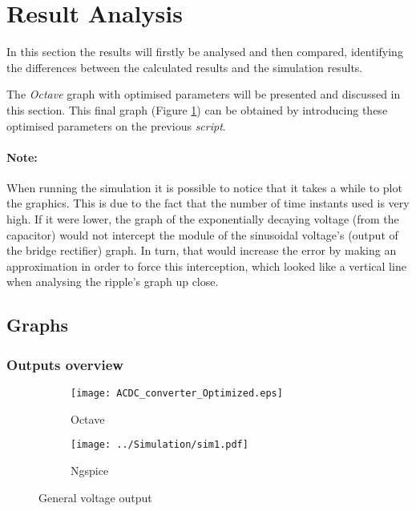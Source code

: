 \section{Result Analysis}
\label{sec:ResultAnalysis}


\indent

In this section the results will firstly be analysed and then compared, identifying the differences between the calculated results and the simulation results. 

The {\it Octave} graph with optimised parameters will be presented and discussed in this section. This final graph (Figure \ref{fig:OutputOC}) can be obtained by introducing these optimised parameters on the previous {\it script}.

\paragraph*{Note:}
When running the simulation it is possible to notice that it takes a while to plot the graphics. This is due to the fact that the number of time instants used is very high. If it were lower, the graph of the exponentially decaying voltage (from the capacitor) would not intercept the module of the sinusoidal voltage's (output of the bridge rectifier) graph. In turn, that would increase the error by making an approximation in order to force this interception, which looked like a vertical line when analysing the ripple's graph up close.

\subsection{Graphs}
\subsubsection{Outputs overview}

\begin{figure}[H]
\centering
\begin{subfigure}{.5\textwidth}
  \centering
  \texttt{[image: ACDC\_converter\_Optimized.eps]}
  \caption{Octave}
  \label{fig:OutputOC}
\end{subfigure}%
\begin{subfigure}{.5\textwidth}
  \centering
  \texttt{[image: ../Simulation/sim1.pdf]}
  \caption{Ngspice}
  \label{fig:OutputNG}
\end{subfigure}
\caption{General voltage output}
\label{fig:Output}
\end{figure}

